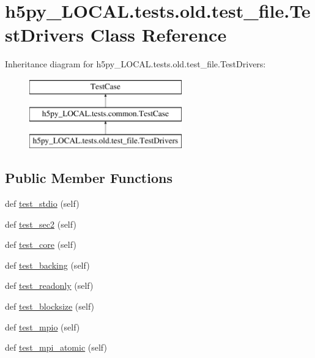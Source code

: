 \hypertarget{classh5py__LOCAL_1_1tests_1_1old_1_1test__file_1_1TestDrivers}{}\section{h5py\+\_\+\+L\+O\+C\+A\+L.\+tests.\+old.\+test\+\_\+file.\+Test\+Drivers Class Reference}
\label{classh5py__LOCAL_1_1tests_1_1old_1_1test__file_1_1TestDrivers}
Inheritance diagram for h5py\+\_\+\+L\+O\+C\+A\+L.\+tests.\+old.\+test\+\_\+file.\+Test\+Drivers\+:\begin{figure}[H]
\begin{center}
\leavevmode
\includegraphics[height=3.000000cm]{classh5py__LOCAL_1_1tests_1_1old_1_1test__file_1_1TestDrivers}
\end{center}
\end{figure}
\subsection*{Public Member Functions}
\begin{DoxyCompactItemize}
\item 
def \hyperlink{classh5py__LOCAL_1_1tests_1_1old_1_1test__file_1_1TestDrivers_a0fe5790e21c93e83526577915d455512}{test\+\_\+stdio} (self)
\item 
def \hyperlink{classh5py__LOCAL_1_1tests_1_1old_1_1test__file_1_1TestDrivers_a712710d4b51a474c1a48acc594993cc9}{test\+\_\+sec2} (self)
\item 
def \hyperlink{classh5py__LOCAL_1_1tests_1_1old_1_1test__file_1_1TestDrivers_a3d0c3281a28f189c5f1698eef132e407}{test\+\_\+core} (self)
\item 
def \hyperlink{classh5py__LOCAL_1_1tests_1_1old_1_1test__file_1_1TestDrivers_a2eb11b01a4a58bc47e2662079051d97a}{test\+\_\+backing} (self)
\item 
def \hyperlink{classh5py__LOCAL_1_1tests_1_1old_1_1test__file_1_1TestDrivers_acbe3d8a67ef06d0fbcb1bff810930de9}{test\+\_\+readonly} (self)
\item 
def \hyperlink{classh5py__LOCAL_1_1tests_1_1old_1_1test__file_1_1TestDrivers_af9d668ffee914a0d6f8d2a8774e0c720}{test\+\_\+blocksize} (self)
\item 
def \hyperlink{classh5py__LOCAL_1_1tests_1_1old_1_1test__file_1_1TestDrivers_ae3174ddf0655a75670fd65e5689ea869}{test\+\_\+mpio} (self)
\item 
def \hyperlink{classh5py__LOCAL_1_1tests_1_1old_1_1test__file_1_1TestDrivers_ac4b67364eefd2c225103ae861d00ef36}{test\+\_\+mpi\+\_\+atomic} (self)
\end{DoxyCompactItemize}
